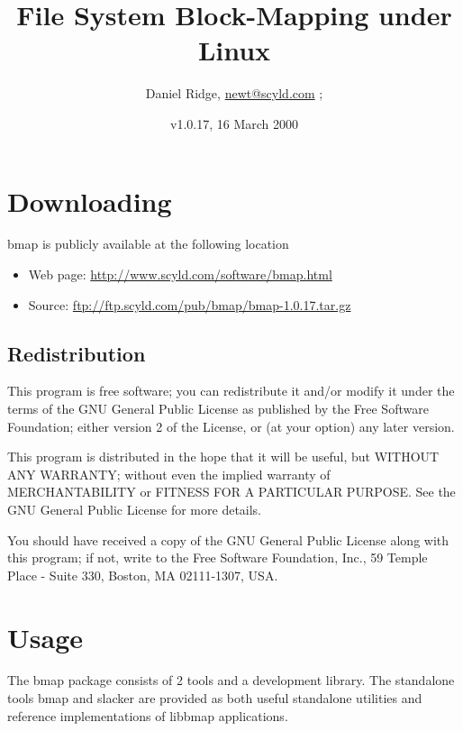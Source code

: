 \documentclass[letterpaper]{article}
\title{File System Block-Mapping under Linux}
\author{Daniel Ridge, {\ttfamily \ifpdf
\href{mailto:newt@scyld.com}{newt@scyld.com}%
\else
\onlynameurl{newt@scyld.com}%
\fi{}
};}
\date{v1.0.17, 16 March 2000}
\begin{document}
\maketitle

\section{Downloading}

bmap is publicly available at the following location
\begin{itemize}
\item Web page: \ifpdf
\href{http://www.scyld.com/software/bmap.html}{http://www.scyld.com/software/bmap.html}%
\else
{}%
\fi{}
\item Source: \ifpdf
\href{ftp://ftp.scyld.com/pub/bmap/bmap-1.0.17.tar.gz}{ftp://ftp.scyld.com/pub/bmap/bmap-1.0.17.tar.gz}%
\else
{}%
\fi{}
\end{itemize}





\subsection{Redistribution}

This program is free software; you can redistribute it and/or modify
it under the terms of the GNU General Public License as published by
the Free Software Foundation; either version 2 of the License, or
(at your option) any later version.

This program is distributed in the hope that it will be useful,
but WITHOUT ANY WARRANTY; without even the implied warranty of
MERCHANTABILITY or FITNESS FOR A PARTICULAR PURPOSE.  See the
GNU General Public License for more details.

You should have received a copy of the GNU General Public License
along with this program; if not, write to the Free Software
Foundation, Inc., 59 Temple Place - Suite 330, Boston, MA 02111-1307, USA.




\section{Usage}

The bmap package consists of 2 tools and a development library.
The standalone tools {\ttfamily bmap} and {\ttfamily slacker} are provided
as both useful standalone utilities and reference implementations of
{\ttfamily libbmap} applications.
\end{document}
